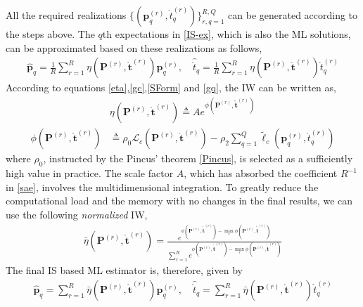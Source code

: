 \documentclass[review]{elsarticle}
\begin{document}
All the required realizations $\lbrace(\boldsymbol{p}_q^{(r)},\mathring{t}_q^{(r)})\rbrace_{r,q=1}^{R,Q}$ can be generated according to the steps above. The $q$th expectations in \eqref{IS-ex}, which is also the ML solutions,  can be approximated based on these realizations as follows,
\begin{align}\label{sae}
    \hat{\boldsymbol{p}}_q=\frac{1}{R}\sum_{r=1}^R\eta(\boldsymbol{P}^{(r)},\mathring{\boldsymbol{t}}^{(r)}) \boldsymbol{p}_q^{(r)},\quad \hat{\mathring{t}}_q=\frac{1}{R}\sum_{r=1}^R\eta(\boldsymbol{P}^{(r)},\mathring{\boldsymbol{t}}^{(r)}) \mathring{t}_q^{(r)}
\end{align}
According to equations \eqref{eta},\eqref{gc},\eqref{SForm} and \eqref{gq}, the IW can be written as, 
\begin{align}\label{IWw}
    &\eta(\boldsymbol{P}^{(r)},\mathring{\boldsymbol{t}}^{(r)})\triangleq A e^{\phi(\boldsymbol{P}^{(r)},\mathring{\boldsymbol{t}}^{(r)})}\\
    \phi(\boldsymbol{P}^{(r)},\mathring{\boldsymbol{t}}^{(r)}) &\triangleq \rho_0 \mathcal{L}_c(\boldsymbol{P}^{(r)},\mathring{\boldsymbol{t}}^{(r)})-\rho_2 \sum_{q=1}^Q \tilde{\ell}_c(\boldsymbol{p}^{(r)}_q,\mathring{t}_q^{(r)})
\end{align}
where $\rho_0$, instructed by the Pincus' theorem \eqref{Pincus}, is selected as a sufficiently high value in practice. The scale factor $A$, which has absorbed the coefficient $R^{-1}$ in \eqref{sae}, involves the multidimensional integration. To greatly reduce the computational load and the memory with no changes in the final results, we can use the following \emph{normalized} IW,
\begin{align}\label{IWss}
    \bar{\eta}(\boldsymbol{P}^{(r)},\mathring{\boldsymbol{t}}^{(r)})=\frac{e^{\phi(\boldsymbol{P}^{(r)},\mathring{\boldsymbol{t}}^{(r)})-\max _r\phi(\boldsymbol{P}^{(r)},\mathring{\boldsymbol{t}}^{(r)})}}{\sum_{r=1}^R e^{\phi(\boldsymbol{P}^{(r)},\mathring{\boldsymbol{t}}^{(r)})-\max _r\phi(\boldsymbol{P}^{(r)},\mathring{\boldsymbol{t}}^{(r)})}}
\end{align}
The final IS based ML estimator is, therefore, given by
\begin{align}
    \hat{\boldsymbol{p}}_q=\sum_{r=1}^R\bar{\eta}(\boldsymbol{P}^{(r)},\mathring{\boldsymbol{t}}^{(r)}) \boldsymbol{p}_q^{(r)},\quad \hat{\mathring{t}}_q=\sum_{r=1}^R\bar{\eta}(\boldsymbol{P}^{(r)},\mathring{\boldsymbol{t}}^{(r)}) \mathring{t}_q^{(r)}
\end{align}
\end{document}
